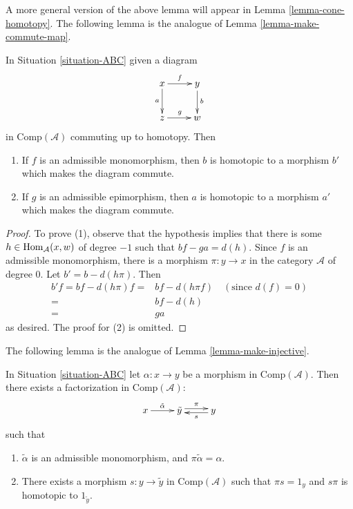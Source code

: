 \noindent
A more general version of the above lemma will appear in
Lemma \ref{lemma-cone-homotopy}. The following lemma is the
analogue of Lemma \ref{lemma-make-commute-map}.

\begin{lemma}
\label{lemma-homo-change}
In Situation \ref{situation-ABC} given a diagram
$$
\xymatrix{x\ar[r]^f\ar[d]_a & y\ar[d]^b\\
z\ar[r]^g & w}
$$
in $\text{Comp}(\mathcal{A})$ commuting up to homotopy. Then
\begin{enumerate}
\item If $f$ is an admissible monomorphism, then $b$ is homotopic
to a morphism $b'$ which makes the diagram commute.
\item If $g$ is an admissible epimorphism, then $a$ is homotopic
to a morphism $a'$ which makes the diagram commute.
\end{enumerate}
\end{lemma}

\begin{proof}
To prove (1), observe that the hypothesis implies that there is some
$h\in\mathop{\mathrm{Hom}}\nolimits_{\mathcal{A}}(x,w)$ of degree $-1$ such that $bf-ga=d(h)$.
Since $f$ is an admissible monomorphism, there is a morphism
$\pi : y \to x$ in the category $\mathcal{A}$ of degree $0$.
Let $b' = b - d(h\pi)$. Then
\begin{align*}
b'f = bf - d(h\pi)f
= &
bf - d(h\pi f) \quad (\text{since }d(f) = 0) \\
= &
bf-d(h) \\
= &
ga
\end{align*}
as desired. The proof for (2) is omitted.
\end{proof}

\noindent
The following lemma is the analogue of Lemma \ref{lemma-make-injective}.

\begin{lemma}
\label{lemma-factor}
In Situation \ref{situation-ABC} let $\alpha : x \to y$
be a morphism in $\text{Comp}(\mathcal{A})$. Then there exists
a factorization in $\text{Comp}(\mathcal{A})$:
$$
\xymatrix{
x \ar[r]^{\tilde{\alpha}}  &
\tilde{y} \ar@<0.5ex>[r]^{\pi} &
y\ar@<0.5ex>[l]^s
}
$$
such that
\begin{enumerate}
\item $\tilde{\alpha}$ is an admissible monomorphism, and
$\pi\tilde{\alpha}=\alpha$.
\item There exists a morphism
$s:y\to\tilde{y}$ in $\text{Comp}(\mathcal{A})$
such that $\pi s=1_y$ and $s\pi$ is homotopic to $1_{\tilde{y}}$. 
\end{enumerate}
\end{lemma}

